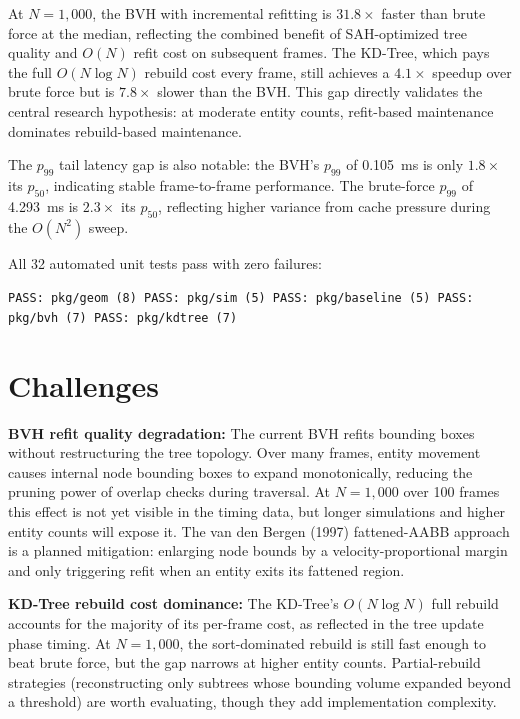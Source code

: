 \documentclass[12pt]{article}
\begin{document}
At $N = 1{,}000$, the BVH with incremental refitting is $31.8\times$ faster than brute force at the median, reflecting the combined benefit of SAH-optimized tree quality and $O(N)$ refit cost on subsequent frames. The KD-Tree, which pays the full $O(N \log N)$ rebuild cost every frame, still achieves a $4.1\times$ speedup over brute force but is $7.8\times$ slower than the BVH. This gap directly validates the central research hypothesis: at moderate entity counts, refit-based maintenance dominates rebuild-based maintenance.

The $p_{99}$ tail latency gap is also notable: the BVH's $p_{99}$ of 0.105~ms is only $1.8\times$ its $p_{50}$, indicating stable frame-to-frame performance. The brute-force $p_{99}$ of 4.293~ms is $2.3\times$ its $p_{50}$, reflecting higher variance from cache pressure during the $O(N^2)$ sweep.

All 32 automated unit tests pass with zero failures:
\begin{center}
\texttt{PASS: pkg/geom (8) \quad PASS: pkg/sim (5) \quad PASS: pkg/baseline (5) \quad PASS: pkg/bvh (7) \quad PASS: pkg/kdtree (7)}
\end{center}

\section{Challenges}

\textbf{BVH refit quality degradation:} The current BVH refits bounding boxes without restructuring the tree topology. Over many frames, entity movement causes internal node bounding boxes to expand monotonically, reducing the pruning power of overlap checks during traversal. At $N = 1{,}000$ over 100 frames this effect is not yet visible in the timing data, but longer simulations and higher entity counts will expose it. The van den Bergen (1997) fattened-AABB approach is a planned mitigation: enlarging node bounds by a velocity-proportional margin and only triggering refit when an entity exits its fattened region.

\textbf{KD-Tree rebuild cost dominance:} The KD-Tree's $O(N \log N)$ full rebuild accounts for the majority of its per-frame cost, as reflected in the tree update phase timing. At $N = 1{,}000$, the sort-dominated rebuild is still fast enough to beat brute force, but the gap narrows at higher entity counts. Partial-rebuild strategies (reconstructing only subtrees whose bounding volume expanded beyond a threshold) are worth evaluating, though they add implementation complexity.
\end{document}
